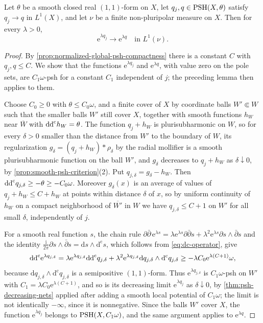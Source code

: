 
\begin{corollary}\label{cor:exponential-psh-measure-continuity}
Let $\theta$ be a smooth closed real $(1,1)$-form on $X$, let $q_j,q\in\mathrm{PSH}(X,\theta)$ satisfy $q_j\to q$ in $L^1(X)$, and let $\nu$ be a finite non-pluripolar measure on $X$. Then for every $\lambda>0$,
\[
 \mathrm e^{\lambda q_j}\longrightarrow\mathrm e^{\lambda q}
                                  \quad\text{in }L^1(\nu).
\]
\end{corollary}
\begin{proof}
By \cref{prop:normalized-global-psh-compactness} there is a constant $C$ with $q_j,q\leq C$. We show that the functions $\mathrm e^{\lambda q_j}$ and $\mathrm e^{\lambda q}$, with value zero on the pole sets, are $C_1\omega$-psh for a constant $C_1$ independent of $j$; the preceding lemma then applies to them.

Choose $C_0\geq0$ with $\theta\leq C_0\omega$, and a finite cover of $X$ by coordinate balls $W'\Subset W$ such that the smaller balls $W'$ still cover $X$, together with smooth functions $h_W$ near $\overline W$ with $\mathrm{dd}^{\mathrm{c}} h_W=\theta$. The function $q_j+h_W$ is plurisubharmonic on $W$, so for every $\delta>0$ smaller than the distance from $W'$ to the boundary of $W$, its regularization $g_\delta=(q_j+h_W)*\rho_\delta$ by the radial mollifier is a smooth plurisubharmonic function on the ball $W'$, and $g_\delta$ decreases to $q_j+h_W$ as $\delta\downarrow0$, by \cref{prop:smooth-psh-criterion}(2). Put $q_{j,\delta}=g_\delta-h_W$. Then $\mathrm{dd}^{\mathrm{c}} q_{j,\delta}\geq-\theta\geq-C_0\omega$. Moreover $g_\delta(x)$ is an average of values of $q_j+h_W\leq C+h_W$ at points within distance $\delta$ of $x$, so by uniform continuity of $h_W$ on a compact neighborhood of $\overline{W'}$ in $W$ we have $q_{j,\delta}\leq C+1$ on $W'$ for all small $\delta$, independently of $j$.

For a smooth real function $s$, the chain rule $\partial\bar\partial\,\mathrm e^{\lambda s}=\lambda\mathrm e^{\lambda s}\partial\bar\partial s+\lambda^2\mathrm e^{\lambda s}\partial s\wedge\bar\partial s$ and the identity $\frac{\mathrm i}{2\pi}\partial s\wedge\bar\partial s=\mathrm ds\wedge\mathrm d^{\mathrm c}s$, which follows from \eqref{eq:dc-operator}, give
\[
 \mathrm{dd}^{\mathrm{c}}\mathrm e^{\lambda q_{j,\delta}}
   =\lambda\mathrm e^{\lambda q_{j,\delta}}\mathrm{dd}^{\mathrm{c}} q_{j,\delta}
      +\lambda^2\mathrm e^{\lambda q_{j,\delta}}
             \mathrm dq_{j,\delta}\wedge\mathrm d^{\mathrm c}q_{j,\delta}
   \geq-\lambda C_0\mathrm e^{\lambda(C+1)}\omega,
\]
because $\mathrm dq_{j,\delta}\wedge\mathrm d^{\mathrm c}q_{j,\delta}$ is a semipositive $(1,1)$-form. Thus $\mathrm e^{\lambda q_{j,\delta}}$ is $C_1\omega$-psh on $W'$ with $C_1=\lambda C_0\mathrm e^{\lambda(C+1)}$, and so is its decreasing limit $\mathrm e^{\lambda q_j}$ as $\delta\downarrow0$, by \cref{thm:psh-decreasing-nets} applied after adding a smooth local potential of $C_1\omega$; the limit is not identically $-\infty$, since it is nonnegative. Since the balls $W'$ cover $X$, the function $\mathrm e^{\lambda q_j}$ belongs to $\mathrm{PSH}(X,C_1\omega)$, and the same argument applies to $\mathrm e^{\lambda q}$.


\end{proof}
